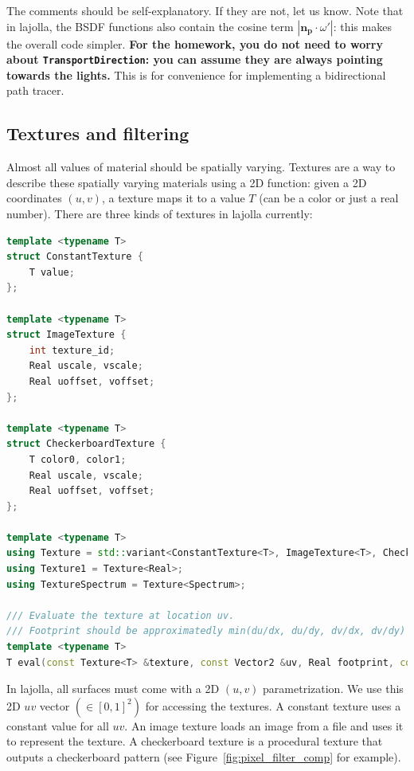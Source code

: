 The comments should be self-explanatory. If they are not, let us know. Note that in lajolla, the BSDF functions also contain the cosine term $|\mathbf{n}_{\mathbf{p}} \cdot \omega'|$: this makes the overall code simpler. \textbf{For the homework, you do not need to worry about \lstinline{TransportDirection}: you can assume they are always pointing towards the lights.} This is for convenience for implementing a bidirectional path tracer.

\subsection{Textures and filtering}
Almost all values of material should be spatially varying. Textures are a way to describe these spatially varying materials using a 2D function: given a 2D coordinates $(u, v)$, a texture maps it to a value $T$ (can be a color or just a real number). There are three kinds of textures in lajolla currently:

\begin{lstlisting}[language=c++]
template <typename T>
struct ConstantTexture {
    T value;
};

template <typename T>
struct ImageTexture {
    int texture_id;
    Real uscale, vscale;
    Real uoffset, voffset;
};

template <typename T>
struct CheckerboardTexture {
    T color0, color1;
    Real uscale, vscale;
    Real uoffset, voffset;
};

template <typename T>
using Texture = std::variant<ConstantTexture<T>, ImageTexture<T>, CheckerboardTexture<T>>;
using Texture1 = Texture<Real>;
using TextureSpectrum = Texture<Spectrum>;

/// Evaluate the texture at location uv.
/// Footprint should be approximatedly min(du/dx, du/dy, dv/dx, dv/dy) for texture filtering.
template <typename T>
T eval(const Texture<T> &texture, const Vector2 &uv, Real footprint, const TexturePool &pool);
\end{lstlisting}

In lajolla, all surfaces must come with a 2D $(u, v)$ parametrization. We use this 2D $uv$ vector $(\in [0, 1]^2)$ for accessing the textures. A constant texture uses a constant value for all $uv$. An image texture loads an image from a file and uses it to represent the texture. A checkerboard texture is a procedural texture that outputs a checkerboard pattern (see Figure~\ref{fig:pixel_filter_comp} for example).

